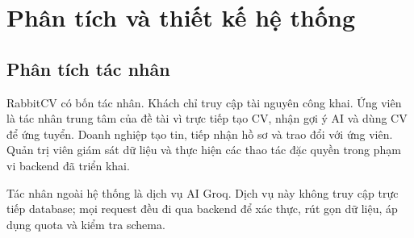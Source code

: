 \chapter{Phân tích và thiết kế hệ thống}

\section{Phân tích tác nhân}

RabbitCV có bốn tác nhân. Khách chỉ truy cập tài nguyên công khai. Ứng viên là tác nhân trung tâm của đề tài vì trực tiếp tạo CV, nhận gợi ý AI và dùng CV để ứng tuyển. Doanh nghiệp tạo tin, tiếp nhận hồ sơ và trao đổi với ứng viên. Quản trị viên giám sát dữ liệu và thực hiện các thao tác đặc quyền trong phạm vi backend đã triển khai.

Tác nhân ngoài hệ thống là dịch vụ AI Groq. Dịch vụ này không truy cập trực tiếp database; mọi request đều đi qua backend để xác thực, rút gọn dữ liệu, áp dụng quota và kiểm tra schema.

